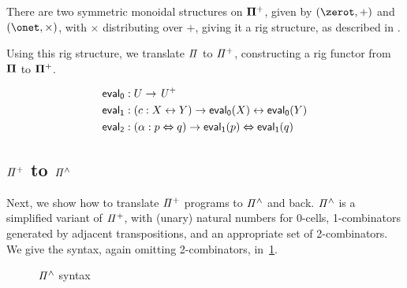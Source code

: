 \begin{proposition}
  There are two symmetric monoidal structures on $\mathbf{\Pi^{+}}$, given by $(\zerot, +)$ and $(\onet, \times)$, with
  $\times$ distributing over $+$, giving it a rig structure, as described in .
\end{proposition}

Using this rig structure, we translate $\mathit{\Pi}$ to $\mathit{{\Pi}^{+}}$, constructing a rig functor from $\mathbf{\Pi}$ to
$\mathbf{\Pi^{+}}$.

\begin{definition}
  \begin{align*}
    \evalt_{0} & : U \to \UPlus                                             \\
    \evalt_{1} & : (c : X \iso Y) \to \evalt_{0}(X) \iso \evalt_{0}(Y)      \\
    \evalt_{2} & : (\alpha : p \Iso q) \to \evalt_{1}(p) \Iso \evalt_{1}(q) \\
  \end{align*}
\end{definition}

\subsection{$\mathit{{\Pi}^{+}}$ to $\mathit{{\Pi}^{\wedge}}$}

Next, we show how to translate $\mathit{{\Pi}^{+}}$ programs to $\mathit{{\Pi}^{\wedge}}$ and back. $\mathit{{\Pi}^{\wedge}}$ is a simplified variant of
$\mathit{{\Pi}^{+}}$, with (unary) natural numbers for 0-cells, 1-combinators generated by adjacent transpositions, and an
appropriate set of 2-combinators. We give the syntax, again omitting 2-combinators, in~\cref{fig:pihat}. 

\begin{figure}[t]
  {}

  {}
  \caption{$\mathit{{\Pi}^{\wedge}}$ syntax}
  \label{fig:pihat}
\end{figure}

